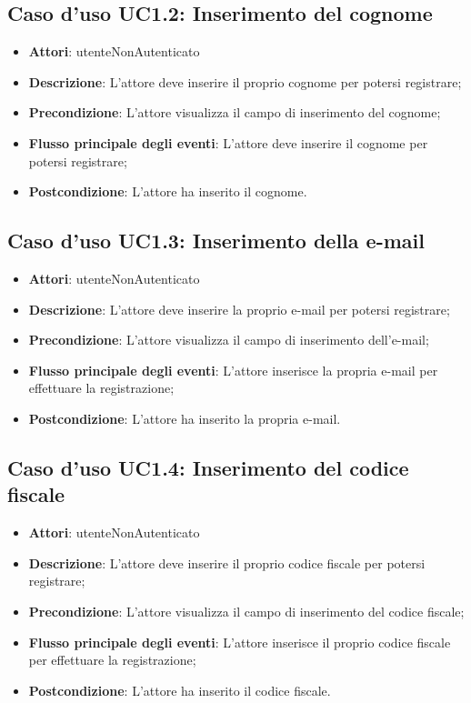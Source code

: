\subsection{Caso d'uso \texorpdfstring{UC1.2}{UC1.2}: Inserimento del cognome}
\begin{itemize}
\item \textbf{Attori}: utenteNonAutenticato
\item \textbf{Descrizione}: L'attore deve inserire il proprio cognome per potersi registrare;
\item \textbf{Precondizione}: L'attore visualizza il campo di inserimento del cognome;
\item \textbf{Flusso principale degli eventi}: L'attore deve inserire il cognome per potersi registrare;
\item \textbf{Postcondizione}: L'attore ha inserito il cognome.
\end{itemize}
\subsection{Caso d'uso \texorpdfstring{UC1.3}{UC1.3}: Inserimento della e-mail}
\begin{itemize}
\item \textbf{Attori}: utenteNonAutenticato
\item \textbf{Descrizione}: L'attore deve inserire la proprio e-mail per potersi registrare;
\item \textbf{Precondizione}: L'attore visualizza il campo di inserimento dell'e-mail;
\item \textbf{Flusso principale degli eventi}: L'attore inserisce la propria e-mail per effettuare la registrazione;
\item \textbf{Postcondizione}: L'attore ha inserito la propria e-mail.
\end{itemize}
\subsection{Caso d'uso \texorpdfstring{UC1.4}{UC1.4}: Inserimento del codice fiscale}
\begin{itemize}
\item \textbf{Attori}: utenteNonAutenticato
\item \textbf{Descrizione}: L'attore deve inserire il proprio codice fiscale per potersi registrare;
\item \textbf{Precondizione}: L'attore visualizza il campo di inserimento del codice fiscale;
\item \textbf{Flusso principale degli eventi}: L'attore inserisce il proprio codice fiscale per effettuare la registrazione;
\item \textbf{Postcondizione}: L'attore ha inserito il codice fiscale.
\end{itemize}
